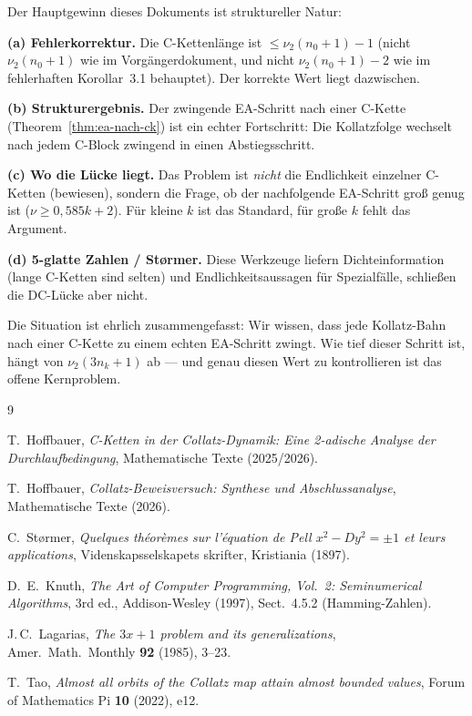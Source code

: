 \documentclass[12pt,a4paper]{article}
\newcommand{\vii}{\nu_2}
\begin{document}
\begin{tcolorbox}[kernidee, title={Fazit}]
Der Hauptgewinn dieses Dokuments ist struktureller Natur:

\textbf{(a) Fehlerkorrektur.} Die C-Kettenlänge ist $\leq \vii(n_0+1) - 1$
(nicht $\vii(n_0+1)$ wie im Vorgängerdokument, und nicht $\vii(n_0+1) - 2$
wie im fehlerhaften Korollar~3.1 behauptet). Der korrekte Wert liegt dazwischen.

\textbf{(b) Strukturergebnis.} Der zwingende EA-Schritt nach einer C-Kette
(Theorem~\ref{thm:ea-nach-ck}) ist ein echter Fortschritt: Die Kollatzfolge
wechselt nach jedem C-Block zwingend in einen Abstiegsschritt.

\textbf{(c) Wo die Lücke liegt.} Das Problem ist \emph{nicht} die Endlichkeit
einzelner C-Ketten (bewiesen), sondern die Frage, ob der nachfolgende EA-Schritt
groß genug ist ($\nu \geq 0{,}585k + 2$). Für kleine $k$ ist das Standard,
für große $k$ fehlt das Argument.

\textbf{(d) 5-glatte Zahlen / Størmer.} Diese Werkzeuge liefern
Dichteinformation (lange C-Ketten sind selten) und Endlichkeitsaussagen für
Spezialfälle, schließen die DC-Lücke aber nicht.

\medskip
Die Situation ist ehrlich zusammengefasst: Wir wissen, dass jede Kollatz-Bahn
nach einer C-Kette zu einem echten EA-Schritt zwingt. Wie tief dieser Schritt
ist, hängt von $\vii(3n_k+1)$ ab --- und genau diesen Wert zu kontrollieren
ist das offene Kernproblem.
\end{tcolorbox}

\begin{thebibliography}{9}

T.\ Hoffbauer,
\textit{C-Ketten in der Collatz-Dynamik: Eine 2-adische Analyse der
Durchlaufbedingung},
Mathematische Texte (2025/2026).

T.\ Hoffbauer,
\textit{Collatz-Beweisversuch: Synthese und Abschlussanalyse},
Mathematische Texte (2026).

C.\ Størmer,
\textit{Quelques théorèmes sur l'équation de Pell $x^2 - Dy^2 = \pm 1$ et
leurs applications},
Videnskapsselskapets skrifter, Kristiania (1897).

D.\ E.\ Knuth,
\textit{The Art of Computer Programming, Vol.~2: Seminumerical Algorithms},
3rd ed., Addison-Wesley (1997), Sect.~4.5.2 (Hamming-Zahlen).

J.\,C.\ Lagarias,
\textit{The $3x+1$ problem and its generalizations},
Amer.\ Math.\ Monthly \textbf{92} (1985), 3--23.

T.\ Tao,
\textit{Almost all orbits of the Collatz map attain almost bounded values},
Forum of Mathematics Pi \textbf{10} (2022), e12.

\end{thebibliography}
\end{document}
